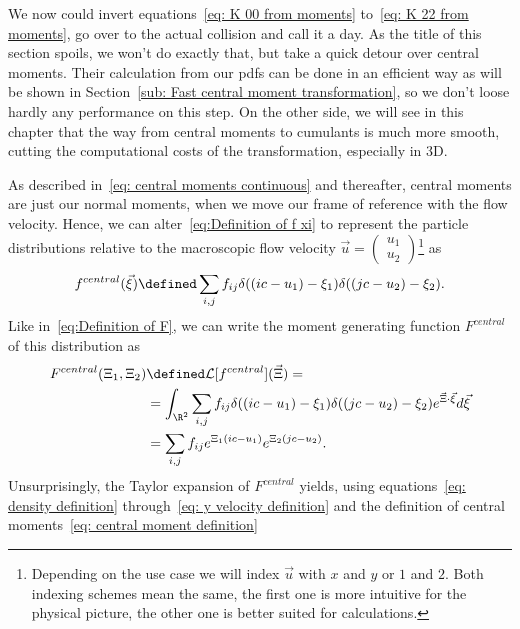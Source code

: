 We now could invert equations~\eqref{eq: K 00 from moments} to~\eqref{eq: K 22 from moments}, go over to the actual collision and call it a day.
As the title of this section spoils, we won't do exactly that, but take a quick detour over central moments.
Their calculation from our \glspl{pdf} can be done in an efficient way as will be shown in Section~\ref{sub: Fast central moment transformation},
so we don't loose hardly any performance on this step.
On the other side, we will see in this chapter that the way from central moments to cumulants is much more smooth, cutting the computational costs of the transformation, especially in 3D.

As described in~\eqref{eq: central moments continuous} and thereafter, central moments are just our normal moments, when we move our frame of reference with the flow velocity.
Hence, we can alter~\eqref{eq:Definition of f xi} to represent the particle distributions relative to the macroscopic flow velocity $\vec{u}=\begin{pmatrix}u_1\\u_2\end{pmatrix}$\footnote{Depending on the use case we will index $\vec{u}$ with $x$ and $y$ or $1$ and $2$.
Both indexing schemes mean the same, the first one is more intuitive for the physical picture, the other one is better suited for calculations.} as
\begin{equation}
  \label{eq:Definition of f c xi}
  f^{central}(\vec{\xi}) \defined \sum_{i,j} f_{ij}\delta((ic - u_1) - \xi_1)\delta((jc - u_2) -\xi_2) .
\end{equation}
Like in~\eqref{eq:Definition of F}, we can write the moment generating function $F^{central}$ of this distribution as
\begin{equation}
  \label{eq: Definition of centralized F}
  \begin{aligned}
    F^{central}(\Xi_1, \Xi_2) & \defined \mathcal{L}[f^{central}](\vec{\Xi}) =  \\
    & = \int_{\R^2} \sum_{i,j} f_{ij}\delta((ic - u_1) - \xi_1)\delta((jc - u_2) -\xi_2) e^{\vec{\Xi} \cdot \vec{\xi}}d\vec{\xi} \\
    & =\sum_{i,j} f_{ij} e^{\Xi_1(ic - u_1)} e^{\Xi_2(jc - u_2)}.
  \end{aligned}
\end{equation}
Unsurprisingly, the Taylor expansion of $F^{central}$ yields, using equations~\eqref{eq: density definition} through~\eqref{eq: y velocity definition} and the definition of central moments~\eqref{eq: central moment definition}

